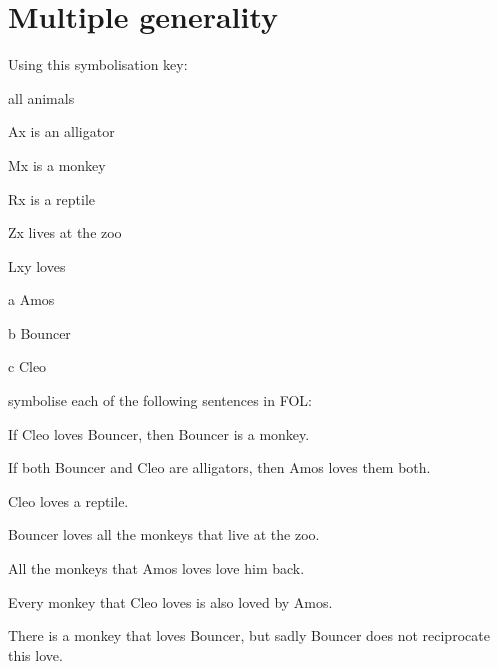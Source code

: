 \chapter{Multiple generality}\setcounter{ProbPart}{0}
\problempart
Using this symbolisation key:
\begin{ekey}
\item[\text{domain}] all animals
\item[Ax]  is an alligator
\item[Mx]  is a monkey
\item[Rx]  is a reptile
\item[Zx]  lives at the zoo
\item[Lxy]  loves 
\item[a] Amos
\item[b] Bouncer
\item[c] Cleo
\end{ekey}
symbolise each of the following sentences in FOL:
\begin{earg}
\item If Cleo loves Bouncer, then Bouncer is a monkey. 
\item[] 
\item If both Bouncer and Cleo are alligators, then Amos loves them both.
\item[] 
\item Cleo loves a reptile.
\item[] 
\item Bouncer loves all the monkeys that live at the zoo.
\item[] \item All the monkeys that Amos loves love him back.
\item[] 
\item Every monkey that Cleo loves is also loved by Amos.
\item[] 
\item There is a monkey that loves Bouncer, but sadly Bouncer does not reciprocate this love.
\item[] 
\end{earg}

